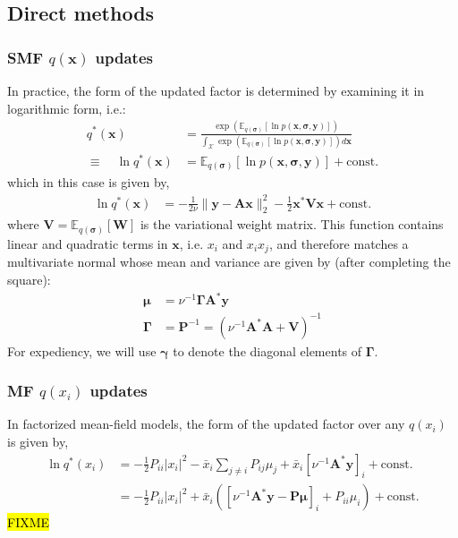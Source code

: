 \documentclass{article}
\newcommand{\m}[1]{\boldsymbol{#1}}
\newcommand{\E}[2]{\mathbb{E}_{#2}\left[ #1 \right]}
\begin{document}
\subsection{Direct methods}
\label{ss:var_direct}

\subsubsection{SMF $q(\m{x})$ updates}
In practice, the form of the updated factor is determined by examining
it in logarithmic form, i.e.:
\begin{equation}
\begin{aligned}
q^*(\m{x}) &= \frac{
 \exp\left(
  \E{\ln p(\m{x}, \m{\sigma}, \m{y})}{q(\m{\sigma})}
 \right)}
{\int_{\mathcal{X}} \exp\left(
  \E{\ln p(\m{x}, \m{\sigma}, \m{y})}{q(\m{\sigma})}
 \right) d\m{x}}
\\ \equiv \quad
\ln q^*(\m{x}) &=
 \E{\ln p(\m{x}, \m{\sigma}, \m{y})}{q(\m{\sigma})} + \text{const.}
\end{aligned}
\label{eq:direct_smf_x}
\end{equation}
which in this case is given by,
\begin{equation*}
\begin{aligned}
\ln q^*(\m{x}) &=
 -\frac{1}{2 \nu} \| \m{y} - \m{A} \m{x} \|_2^2
 -\frac{1}{2} \m{x}^* \m{V} \m{x}
 +\text{const.}
\end{aligned}
\end{equation*}
where $\m{V} = \E{\m{W}}{q(\m{\sigma})}$ is the variational weight matrix.
This function contains linear and quadratic terms in $\m{x}$, i.e. $x_i$
and $x_i x_j$, and therefore matches a multivariate normal whose mean
and variance are given by (after completing the square):
\begin{equation*}
\begin{aligned}
\m{\mu} &= \nu^{-1} \m{\Gamma} \m{A}^* \m{y}
\\
\m{\Gamma} &=
 \m{P}^{-1} = \left( \nu^{-1} \m{A}^* \m{A} + \m{V} \right)^{-1}
\end{aligned}
\end{equation*}
For expediency, we will use $\m{\gamma}$ to denote the diagonal elements
of $\m{\Gamma}$.

\subsubsection{MF $q(x_i)$ updates}
In factorized mean-field models, the form of the updated factor over
any $q(x_i)$ is given by,
\begin{equation*}
\begin{aligned}
\ln q^*(x_i) &=
 -\frac{1}{2} P_{ii} |x_i|^2
 -\bar{x}_i \sum_{j \ne i} P_{ij} \mu_j
 +\bar{x}_i \left[ \nu^{-1} \m{A}^* \m{y} \right]_i
 +\text{const.}
\\ &=
 -\frac{1}{2} P_{ii} |x_i|^2
 +\bar{x}_i \left(
   \left[ \nu^{-1} \m{A}^* \m{y} - \m{P} \m{\mu} \right]_i
     + P_{ii} \mu_i
   \right)
 +\text{const.}
\end{aligned}
\end{equation*}
\hl{FIXME}
\end{document}

